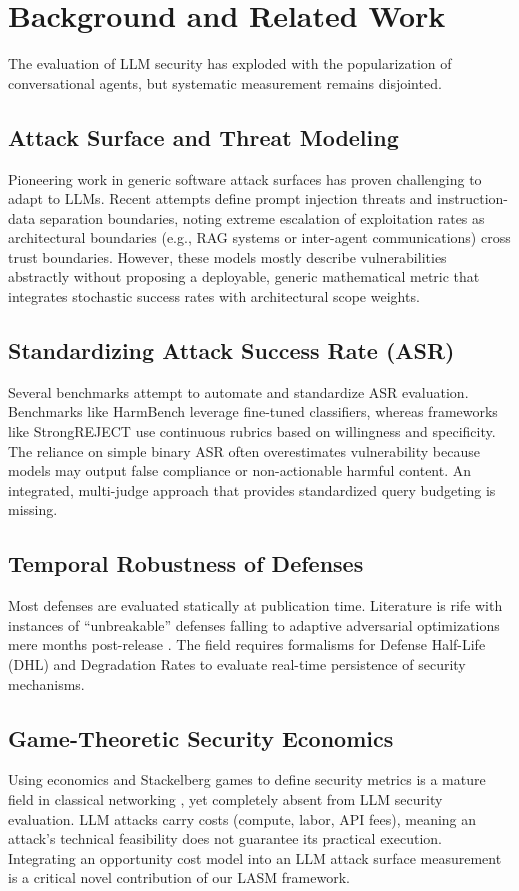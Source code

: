 \section{Background and Related Work}
\label{sec:background}

The evaluation of LLM security has exploded with the popularization of conversational agents, but systematic measurement remains disjointed. 

\subsection{Attack Surface and Threat Modeling}
Pioneering work in generic software attack surfaces \cite{manadhata2011attack} has proven challenging to adapt to LLMs. Recent attempts \cite{zverev2025can, lupinacci2025dark} define prompt injection threats and instruction-data separation boundaries, noting extreme escalation of exploitation rates as architectural boundaries (e.g., RAG systems or inter-agent communications) cross trust boundaries. However, these models mostly describe vulnerabilities abstractly without proposing a deployable, generic mathematical metric that integrates stochastic success rates with architectural scope weights.

\subsection{Standardizing Attack Success Rate (ASR)}
Several benchmarks attempt to automate and standardize ASR evaluation. Benchmarks like HarmBench leverage fine-tuned classifiers, whereas frameworks like StrongREJECT \cite{souly2024strongreject} use continuous rubrics based on willingness and specificity. The reliance on simple binary ASR often overestimates vulnerability because models may output false compliance or non-actionable harmful content. An integrated, multi-judge approach that provides standardized query budgeting is missing.

\subsection{Temporal Robustness of Defenses}
Most defenses are evaluated statically at publication time. Literature is rife with instances of ``unbreakable'' defenses falling to adaptive adversarial optimizations mere months post-release \cite{nasr2025attacker}. The field requires formalisms for Defense Half-Life (DHL) and Degradation Rates to evaluate real-time persistence of security mechanisms.

\subsection{Game-Theoretic Security Economics}
Using economics and Stackelberg games to define security metrics is a mature field in classical networking \cite{grossklags2008secure, miehling2015pomdp}, yet completely absent from LLM security evaluation. LLM attacks carry costs (compute, labor, API fees), meaning an attack's technical feasibility does not guarantee its practical execution. Integrating an opportunity cost model into an LLM attack surface measurement is a critical novel contribution of our LASM framework.
